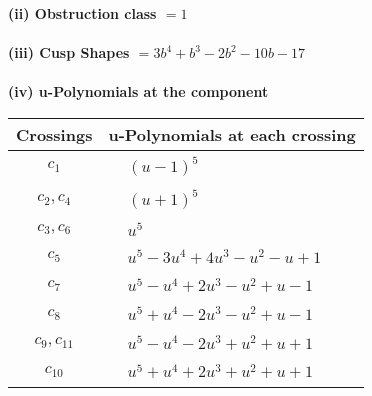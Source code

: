 \documentclass[1p]{elsarticle_modified}
\theoremstyle{definition}
\begin{document}
\flushleft \textbf{(ii) Obstruction class $= 1$}\\~\\
\flushleft \textbf{(iii) Cusp Shapes $= 3 b^4+b^3-2 b^2-10 b-17$}\\~\\
\newpage\renewcommand{\arraystretch}{1}
\flushleft \textbf{(iv) u-Polynomials at the component}\newline \\
\begin{tabular}{m{50pt}|m{274pt}}
Crossings & \hspace{64pt}u-Polynomials at each crossing \\
\hline $$\begin{aligned}c_{1}\end{aligned}$$&$\begin{aligned}
&(u-1)^5
\end{aligned}$\\
\hline $$\begin{aligned}c_{2},c_{4}\end{aligned}$$&$\begin{aligned}
&(u+1)^5
\end{aligned}$\\
\hline $$\begin{aligned}c_{3},c_{6}\end{aligned}$$&$\begin{aligned}
&u^5
\end{aligned}$\\
\hline $$\begin{aligned}c_{5}\end{aligned}$$&$\begin{aligned}
&u^5-3 u^4+4 u^3- u^2- u+1
\end{aligned}$\\
\hline $$\begin{aligned}c_{7}\end{aligned}$$&$\begin{aligned}
&u^5- u^4+2 u^3- u^2+u-1
\end{aligned}$\\
\hline $$\begin{aligned}c_{8}\end{aligned}$$&$\begin{aligned}
&u^5+u^4-2 u^3- u^2+u-1
\end{aligned}$\\
\hline $$\begin{aligned}c_{9},c_{11}\end{aligned}$$&$\begin{aligned}
&u^5- u^4-2 u^3+u^2+u+1
\end{aligned}$\\
\hline $$\begin{aligned}c_{10}\end{aligned}$$&$\begin{aligned}
&u^5+u^4+2 u^3+u^2+u+1
\end{aligned}$\\
\hline
\end{tabular}\\~\\
\end{document}
